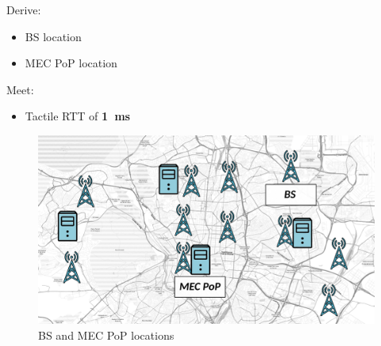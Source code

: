\documentclass[aspectratio=169]{beamer}
\begin{document}
\begin{frame}
    \frametitle{\secname}
    \framesubtitle{\subsecname}
    \vfill
    \begin{minipage}{0.27\textwidth}
        Derive:
        \begin{itemize}
            \item BS location
            \item MEC PoP location
        \end{itemize}
        Meet:
        \begin{itemize}
            \item Tactile RTT of \mbox{\textbf{1 ms}}
        \end{itemize}
    \end{minipage}
    \hfill
    \begin{minipage}{0.68\textwidth}
        \begin{figure}
            \centering
            \includegraphics[width=\textwidth]{img/pop-and-antennas.pdf}
            \caption{BS and MEC PoP locations}
            \label{fig:bs-pop-locations}
        \end{figure}
    \end{minipage}
    \vfill
\end{frame}
\end{document}

